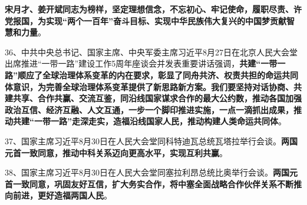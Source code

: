 \textbf{{宋月才、姜开斌同志为榜样，坚定理想信念，不忘初心、牢记使命，履职尽责、许党报国，为实现``两个一百年''奋斗目标、实现中华民族伟大复兴的中国梦贡献智慧和力量}}。

36、中共中央总书记、国家主席、中央军委主席习近平8月27日在北京人民大会堂出席推进``一带一路''建设工作5周年座谈会并发表重要讲话强调，{\textbf{共建``一带一路''顺应了全球治理体系变革的内在要求，彰显了同舟共济、权责共担的命运共同体意识，为完善全球治理体系变革提供了新思路新方案。我们要坚持对话协商、共建共享、合作共赢、交流互鉴，同沿线国家谋求合作的最大公约数，推动各国加强政治互信、经济互融、人文互通，一步一个脚印推进实施，一点一滴抓出成果，推动共建``一带一路''走深走实，造福沿线国家人民，推动构建人类命运共同体}}。

37、国家主席习近平8月30日在人民大会堂同科特迪瓦总统瓦塔拉举行会谈。{\textbf{两国元首一致同意，推动中科关系迈向更高水平，实现互利共赢}}。

38、国家主席习近平8月30日在人民大会堂同塞拉利昂总统比奥举行会谈。{\textbf{两国元首一致同意，巩固友好互信，扩大务实合作，将中塞全面战略合作伙伴关系不断推向前进，更好造福两国人民}}。
